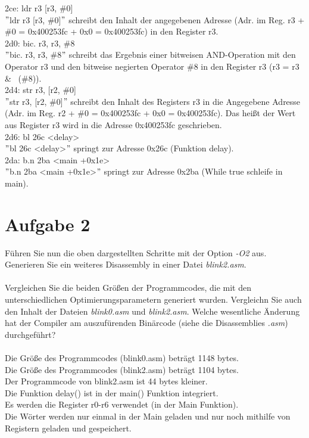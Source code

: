 2ce: ldr r3 [r3, \#0]\\
$"$ldr r3 [r3, \#0]$"$ schreibt den Inhalt der angegebenen Adresse (Adr. im Reg. r3 + \#0 = 0x400253fc + 0x0 = 0x400253fc) in den Register r3.\\
2d0: bic. r3, r3, \#8\\
$"$bic. r3, r3, \#8$"$ schreibt das Ergebnis einer bitweisen AND-Operation mit den Operator r3 und den bitweise negierten Operator \#8 in den Register r3 (r3 = r3 \& ~(\#8)).\\
2d4: str r3, [r2, \#0]\\
$"$str r3, [r2, \#0]$"$ schreibt den Inhalt des Registers r3 in die Angegebene Adresse (Adr. im Reg. r2 + \#0 = 0x400253fc + 0x0 = 0x400253fc). Das hei\ss{}t der Wert aus Register r3 wird in die Adresse 0x400253fc geschrieben.\\
2d6: bl 26c <delay>\\
$"$bl 26c <delay>$"$ springt zur Adresse 0x26c (Funktion delay).\\
2da: b.n 2ba <main +0x1e>\\
$"$b.n 2ba <main +0x1e>$"$ springt zur Adresse 0x2ba (While true schleife in main).\\
\newpage
\section{Aufgabe 2}
Führen Sie nun die oben dargestellten Schritte mit der Option \textit{-O2} aus. Generieren Sie ein weiteres Disassembly in einer Datei \textit{blink2.asm}.\\ \\
Vergleichen Sie die beiden Grö\ss{}en der Programmcodes, die mit den unterschiedlichen Optimierungsparametern generiert wurden. Vergleichn Sie auch den Inhalt der Dateien \textit{blink0.asm} und \textit{blink2.asm}. Welche wesentliche Änderung hat der Compiler am auszufürenden Binärcode (siehe die Disassemblies \textit{.asm}) durchgeführt?\\ \\
Die Grö\ss{}e des Programmcodes (blink0.asm) beträgt 1148 bytes.\\
Die Grö\ss{}e des Programmcodes (blink2.asm) beträgt 1104 bytes.\\
Der Programmcode von blink2.asm ist 44 bytes kleiner.\\
Die Funktion delay() ist in der main() Funktion integriert.\\
Es werden die Register r0-r6 verwendet (in der Main Funktion).\\
Die Wörter werden nur einmal in der Main geladen und nur noch mithilfe von Registern geladen und gespeichert.\\
